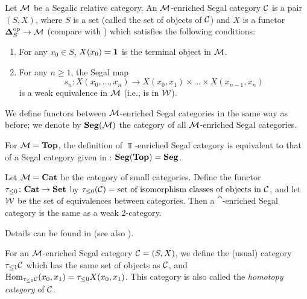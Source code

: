 \begin{definition}\label{d:segal-enriched}
  Let $\mathcal{M}$ be a Segalic relative category. An $\mathcal{M}$-enriched Segal category
  $\mathcal{C}$ is a pair $(S,X)$, where $S$ is a set (called the set of objects of
  $\mathcal{C}$) and $X$ is a functor $\mathbf{\Delta}_S^{\mathrm{op}}\to \mathcal{M}$ (compare with
  ) which satisfies the following conditions:
    \begin{enumerate}
      \item For any $x_0\in S$, $X(x_0)=\mathbf{1}$ is the terminal object in $\mathcal{M}$.
      \item For any $n\ge 1$, the Segal map
      $$
         s_n\colon X(x_0, \dots, x_n)\to
                X(x_0, x_1)\times \dots\times X(x_{n-1}, x_n)
      $$
      is a weak equivalence in $\mathcal{M}$ (i.e., is in $\mathcal{W}$).
    \end{enumerate}

    We define functors between $\mathcal{M}$-enriched Segal categories in the same way
    as before; we denote by $\mathbf{Seg}(\mathcal{M})$ the category of all $\mathcal{M}$-enriched
    Segal categories.
\end{definition}

\begin{example}\label{x:top-segal}
  For $\mathcal{M}=\mathbf{Top}$, the definition of $\Top$-enriched Segal category is
  equivalent to that of a Segal category given in :
  $\mathbf{Seg}(\mathbf{Top}) = \mathbf{Seg}$.
\end{example}
\begin{example}\label{x:tamsamani-2cat}
  Let $\mathcal{M}=\mathbf{Cat}$ be the category of small categories. Define the functor
  $\tau_{\leq 0}\colon \mathbf{Cat}\to \mathbf{Set}$ by $\tau_{\leq 0}(\mathcal{C})=\text{set of isomorphism
  classes of objects in }\mathcal{C}$, and let $\mathcal{W}$ be the set of equivalences
  between categories. Then a $\cat$-enriched Segal category is the same as a
  weak 2-category.

  Details can be found in \cite[Section 4]{tamsamani} (see also
  \cite{lack-paoli}).
\end{example}
For an $\mathcal{M}$-enriched Segal category $\mathcal{C}=(S, X)$, we define the (usual)
category $\tau_{\leq 1}\mathcal{C}$ which has the same set of objects as $\mathcal{C}$, and
$\operatorname{Hom}_{\tau_{\leq 1} \mathcal{C}}(x_0, x_1)=\tau_{\leq 0} X(x_0, x_1)$. This category
is also called the \emph{homotopy category} of $\mathcal{C}$.

